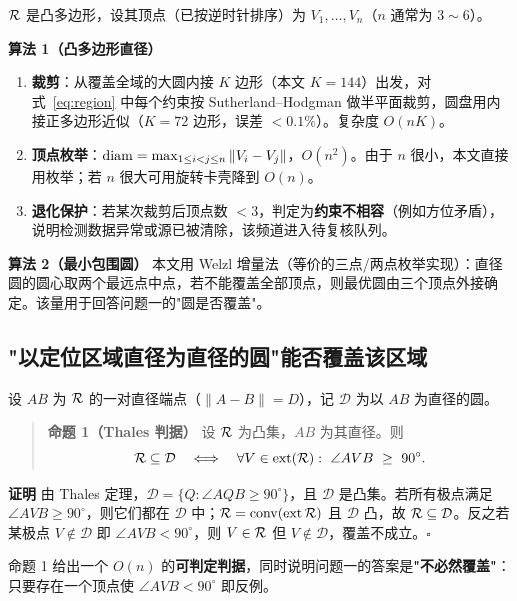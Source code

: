 $\mathcal{R}$ 是凸多边形，设其顶点（已按逆时针排序）为 $V_1,\dots,V_n$（$n$ 通常为 $3\!\sim\!6$）。

\noindent\textbf{算法 1（凸多边形直径）}
\begin{enumerate}
  \item \textbf{裁剪}：从覆盖全域的大圆内接 $K$ 边形（本文 $K=144$）出发，对式~\eqref{eq:region} 中每个约束按 Sutherland--Hodgman 做半平面裁剪，圆盘用内接正多边形近似（$K=72$ 边形，误差 $<0.1\%$）。复杂度 $O(nK)$。
  \item \textbf{顶点枚举}：$\operatorname{diam}=\max_{1\le i<j\le n}\|V_i-V_j\|$，$O(n^2)$。由于 $n$ 很小，本文直接用枚举；若 $n$ 很大可用旋转卡壳降到 $O(n)$。
  \item \textbf{退化保护}：若某次裁剪后顶点数 $<3$，判定为\textbf{约束不相容}（例如方位矛盾），说明检测数据异常或源已被清除，该频道进入待复核队列。
\end{enumerate}

\noindent\textbf{算法 2（最小包围圆）} 本文用 Welzl 增量法（等价的三点/两点枚举实现）：直径圆的圆心取两个最远点中点，若不能覆盖全部顶点，则最优圆由三个顶点外接确定。该量用于回答问题一的"圆是否覆盖"。

\subsection{"以定位区域直径为直径的圆"能否覆盖该区域}

设 $AB$ 为 $\mathcal{R}$ 的一对直径端点（$\|A-B\|=D$），记 $\mathcal D$ 为以 $AB$ 为直径的圆。

\begin{quote}
\textbf{命题 1（Thales 判据）} 设 $\mathcal{R}$ 为凸集，$AB$ 为其直径。则
\begin{equation}
\mathcal{R}\subseteq\mathcal D
\quad\Longleftrightarrow\quad
\forall V\in\operatorname{ext}(\mathcal{R}):\ \angle AVB\ \ge\ 90^\circ .
\label{eq:thales}
\end{equation}
\end{quote}

\noindent\textbf{证明} 由 Thales 定理，$\mathcal D=\{Q:\angle AQB\ge90^\circ\}$，且 $\mathcal D$ 是凸集。若所有极点满足 $\angle AVB\ge90^\circ$，则它们都在 $\mathcal D$ 中；$\mathcal{R}=\operatorname{conv}(\operatorname{ext}\mathcal{R})$ 且 $\mathcal D$ 凸，故 $\mathcal{R}\subseteq\mathcal D$。反之若某极点 $V\notin\mathcal D$ 即 $\angle AVB<90^\circ$，则 $V\in\mathcal{R}$ 但 $V\notin\mathcal D$，覆盖不成立。$\square$

命题 1 给出一个 $O(n)$ 的\textbf{可判定判据}，同时说明问题一的答案是\textbf{"不必然覆盖"}：只要存在一个顶点使 $\angle AVB<90^\circ$ 即反例。

